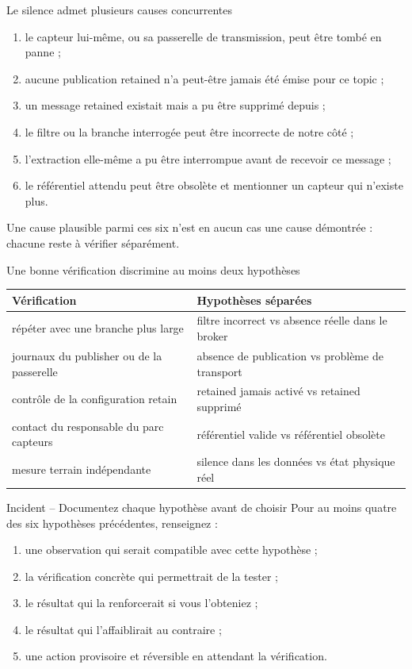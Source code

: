 \documentclass[aspectratio=169]{beamer}
\begin{document}
\begin{frame}{Le silence admet plusieurs causes concurrentes}
\begin{enumerate}
\item le capteur lui-même, ou sa passerelle de transmission, peut être tombé en panne ;
\item aucune publication retained n'a peut-être jamais été émise pour ce topic ;
\item un message retained existait mais a pu être supprimé depuis ;
\item le filtre ou la branche interrogée peut être incorrecte de notre côté ;
\item l'extraction elle-même a pu être interrompue avant de recevoir ce message ;
\item le référentiel attendu peut être obsolète et mentionner un capteur qui n'existe plus.
\end{enumerate}
Une cause plausible parmi ces six n'est en aucun cas une cause démontrée : chacune reste à vérifier séparément.
\end{frame}

\begin{frame}{Une bonne vérification discrimine au moins deux hypothèses}
\small
\begin{tabular}{@{}p{}p{}@{}}
\toprule
Vérification & Hypothèses séparées \\
\midrule
répéter avec une branche plus large & filtre incorrect vs absence réelle dans le broker \\[2pt]
journaux du publisher ou de la passerelle & absence de publication vs problème de transport \\[2pt]
contrôle de la configuration retain & retained jamais activé vs retained supprimé \\[2pt]
contact du responsable du parc capteurs & référentiel valide vs référentiel obsolète \\[2pt]
mesure terrain indépendante & silence dans les données vs état physique réel \\
\bottomrule
\end{tabular}
\end{frame}

\begin{frame}{Incident -- Documentez chaque hypothèse avant de choisir}
\small
Pour au moins quatre des six hypothèses précédentes, renseignez :
\begin{enumerate}
\item une observation qui serait compatible avec cette hypothèse ;
\item la vérification concrète qui permettrait de la tester ;
\item le résultat qui la renforcerait si vous l'obteniez ;
\item le résultat qui l'affaiblirait au contraire ;
\item une action provisoire et réversible en attendant la vérification.
\end{enumerate}
\end{frame}
\end{document}
